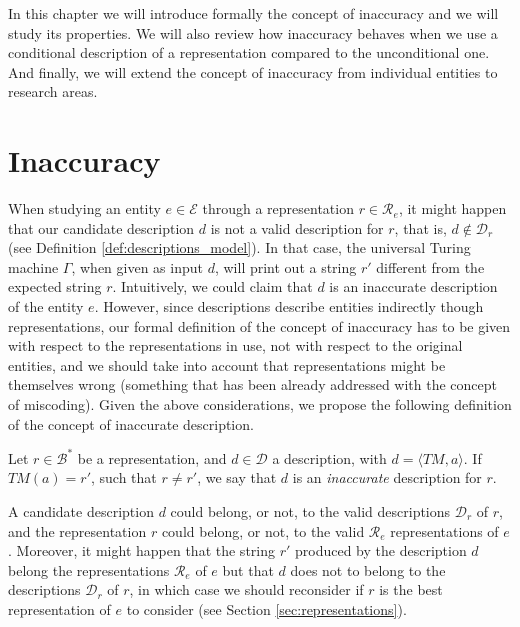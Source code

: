 In this chapter we will introduce formally the concept of inaccuracy and we will study its properties. We will also review how inaccuracy behaves when we use a conditional description of a representation compared to the unconditional one. And finally, we will extend the concept of inaccuracy from individual entities to research areas.

%
%
\section{Inaccuracy}
\label{sec:inaccuracy:inaccuracy}

When studying an entity $e \in \mathcal{E}$ through a representation $r \in \mathcal{R}_e$, it might happen that our candidate description $d$ is not a valid description for $r$, that is, $d \notin \mathcal{D}_r$ (see Definition \ref{def:descriptions_model}). In that case, the universal Turing machine $\Gamma$, when given as input $d$, will print out a string $r'$ different from the expected string $r$. Intuitively, we could claim that $d$ is an inaccurate description of the entity $e$. However, since descriptions describe entities indirectly though representations, our formal definition of the concept of inaccuracy has to be given with respect to the representations in use, not with respect to the original entities, and we should take into account that representations might be themselves wrong (something that has been already addressed with the concept of miscoding). Given the above considerations, we propose the following definition of the concept of inaccurate description.

\begin{definition}
Let $r \in \mathcal{B}^\ast$ be a representation, and $d \in \mathcal{D}$ a description, with $ d = \langle TM, a \rangle$. If $TM(a) = r'$, such that $r \neq r'$, we say that $d$ is an \emph{inaccurate} description for $r$.
\end{definition}

A candidate description $d$ could belong, or not, to the valid descriptions $\mathcal{D}_r$ of $r$,
and the representation $r$ could belong, or not, to the valid $\mathcal{R}_e$ representations of $e$. Moreover, it might happen that the string $r'$ produced by the description $d$ belong the representations $\mathcal{R}_e$ of $e$ but that $d$ does not to belong to the descriptions $\mathcal{D}_r$ of $r$, in which case we should reconsider if $r$ is the best representation of $e$ to consider (see Section \ref{sec:representations}).

